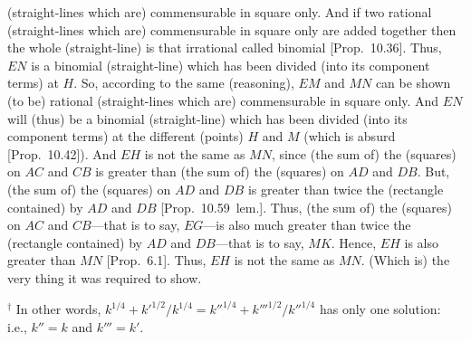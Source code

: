 \begin{Parallel}{}{}
{(straight-lines which are) commensurable in square only. And if two
rational (straight-lines which are) commensurable in square only are
added together then the whole (straight-line) is that irrational called
binomial [Prop.~10.36]. Thus, $EN$
is a binomial (straight-line) which has been divided (into its component terms) at $H$. So, according to
the same (reasoning), $EM$ and $MN$ can be shown (to be) rational
(straight-lines which are) commensurable in square only. And $EN$
will (thus) be a binomial (straight-line) which has been divided (into its component terms) at the different (points)
$H$ and $M$ (which is absurd [Prop.~10.42]).
And $EH$ is not the same as $MN$, since (the sum of) the
(squares) on $AC$ and $CB$ is greater than (the sum of) the (squares) on
$AD$ and $DB$. But, (the sum of) the (squares) on $AD$ and $DB$
is greater than twice the (rectangle contained) by $AD$ and $DB$ [Prop.~10.59~lem.]. Thus,  (the sum of) the (squares) on $AC$ and $CB$---that is to say, $EG$---is also much greater than twice the (rectangle contained) by 
$AD$ and $DB$---that is to say, $MK$. Hence, $EH$ is also greater
than $MN$ [Prop.~6.1]. Thus, $EH$ is not the same as $MN$. (Which is) the very thing
it was required to show.}
\end{Parallel}
{\footnotesize\noindent$^\dag$ In other words, $k^{1/4}+k'^{1/2}/k^{1/4}
= k''^{1/4}+k'''^{1/2}/k''^{1/4}$
has only one solution: {i.e.}, $k''=k$ and $k'''=k'$.}

